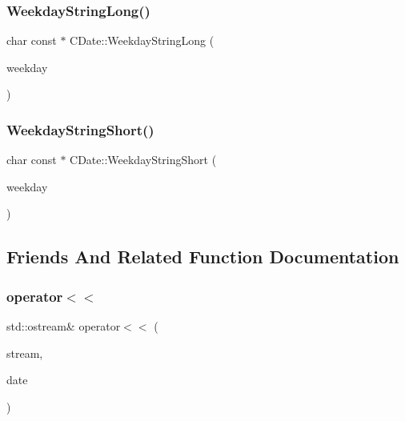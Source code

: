 \subsubsection{\texorpdfstring{Weekday\+String\+Long()}{WeekdayStringLong()}}
{\footnotesize\ttfamily char const  $\ast$ C\+Date\+::\+Weekday\+String\+Long (\begin{DoxyParamCaption}\item[{int}]{weekday }\end{DoxyParamCaption})\hspace{0.3cm}{\ttfamily [static]}}

\mbox{\label{class_c_date_aff31350db373c3483a62b67f7467b578}} 
\subsubsection{\texorpdfstring{Weekday\+String\+Short()}{WeekdayStringShort()}}
{\footnotesize\ttfamily char const  $\ast$ C\+Date\+::\+Weekday\+String\+Short (\begin{DoxyParamCaption}\item[{int}]{weekday }\end{DoxyParamCaption})\hspace{0.3cm}{\ttfamily [static]}}



\subsection{Friends And Related Function Documentation}
\mbox{\label{class_c_date_a6101b1c471c7790dcb75f5746f719c5f}} 
\subsubsection{\texorpdfstring{operator$<$$<$}{operator<<}\hspace{0.1cm}{\footnotesize\ttfamily [1/2]}}
{\footnotesize\ttfamily std\+::ostream\& operator$<$$<$ (\begin{DoxyParamCaption}\item[{std\+::ostream \&}]{stream,  }\item[{const \mbox{\hyperlink{class_c_date}{C\+Date}} \&}]{date }\end{DoxyParamCaption})\hspace{0.3cm}{\ttfamily [friend]}}

